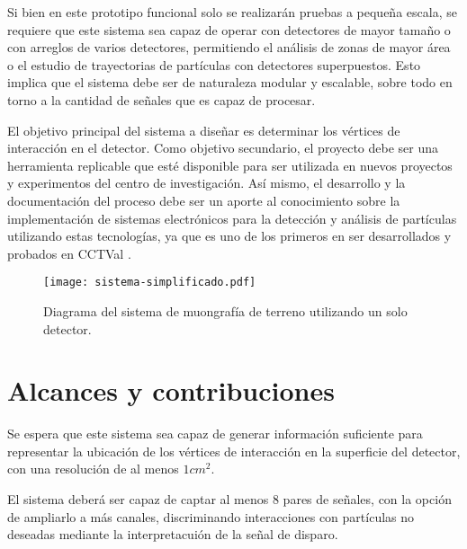 Si bien en este prototipo funcional solo se realizarán pruebas a pequeña escala, se requiere que este sistema sea capaz de operar con detectores de mayor tamaño o con arreglos de varios detectores, permitiendo el análisis de zonas de mayor área o el estudio de trayectorias de partículas con detectores superpuestos. Esto implica que el sistema debe ser de naturaleza modular y escalable, sobre todo en torno a la cantidad de señales que es capaz de procesar.  %
	
	El objetivo principal del sistema a diseñar es determinar los vértices de interacción en el detector. Como objetivo secundario, el proyecto debe ser una herramienta replicable que esté disponible para ser utilizada en nuevos proyectos y experimentos del centro de investigación. Así mismo, el desarrollo y la documentación del proceso debe ser un aporte al conocimiento sobre la implementación de sistemas electrónicos para la detección y análisis de partículas utilizando estas tecnologías, ya que es uno de los primeros en ser desarrollados y probados en CCTVal . %
	
	\begin{figure}[t]
		\centering
		\texttt{[image: sistema-simplificado.pdf]}
		\caption{Diagrama del sistema de muongrafía de terreno utilizando un solo detector.}
		\label{img:sistema}
	\end{figure}						

\section{Alcances y contribuciones}

	Se espera que este sistema sea capaz de generar información suficiente para representar la ubicación de los vértices de interacción en la superficie del detector, con una resolución de al menos $1cm^2$.
	
	El sistema deberá ser capaz de captar al menos 8 pares de señales, con la opción de ampliarlo a más canales, discriminando interacciones con partículas no deseadas mediante la interpretacuión de la señal de disparo.
	
